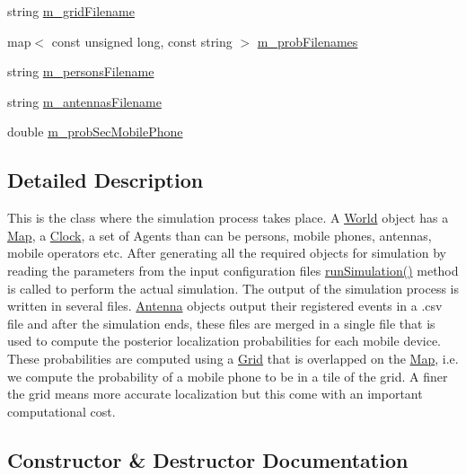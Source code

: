 \begin{DoxyCompactItemize}
\item 
string \hyperlink{class_world_a91e15a41a1a885770916c6b560883d5f}{m\+\_\+grid\+Filename}
\item 
map$<$ const unsigned long, const string $>$ \hyperlink{class_world_afec4433aef7c6e667c669b83a62695ea}{m\+\_\+prob\+Filenames}
\item 
string \hyperlink{class_world_a66e68ec2220ea27e705aac88a920b6fd}{m\+\_\+persons\+Filename}
\item 
string \hyperlink{class_world_ac38e4d56d6bcabc35cf0e6763892a7a2}{m\+\_\+antennas\+Filename}
\item 
double \hyperlink{class_world_a45e13597d542b7f2eb0b0d77e1a8633f}{m\+\_\+prob\+Sec\+Mobile\+Phone}
\end{DoxyCompactItemize}


\subsection{Detailed Description}
This is the class where the simulation process takes place. A \hyperlink{class_world}{World} object has a \hyperlink{class_map}{Map}, a \hyperlink{class_clock}{Clock}, a set of Agents than can be persons, mobile phones, antennas, mobile operators etc. After generating all the required objects for simulation by reading the parameters from the input configuration files \hyperlink{class_world_aa825a43f968c8fe750c67156e64721ff}{run\+Simulation()} method is called to perform the actual simulation. The output of the simulation process is written in several files. \hyperlink{class_antenna}{Antenna} objects output their registered events in a .csv file and after the simulation ends, these files are merged in a single file that is used to compute the posterior localization probabilities for each mobile device. These probabilities are computed using a \hyperlink{class_grid}{Grid} that is overlapped on the \hyperlink{class_map}{Map}, i.\+e. we compute the probability of a mobile phone to be in a tile of the grid. A finer the grid means more accurate localization but this come with an important computational cost. 

\subsection{Constructor \& Destructor Documentation}
\mbox{\label{class_world_a94871f094bb3eabb67f5bd1b10396832}} 
